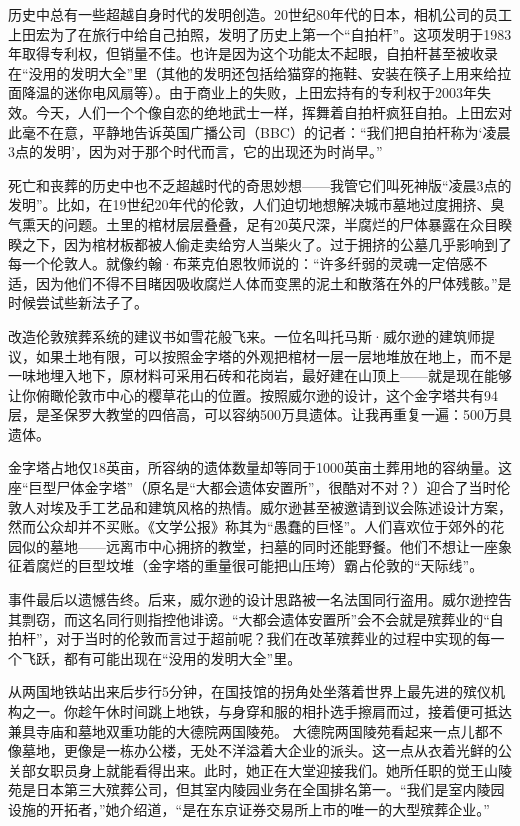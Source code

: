 \documentclass[12pt,oneside]{book}
\begin{document}
\begin{bookref}[frametitle={\cite{好好告别：世界葬礼观察手记}}]
历史中总有一些超越自身时代的发明创造。20世纪80年代的日本，相机公司的员工上田宏为了在旅行中给自己拍照，发明了历史上第一个“自拍杆”。这项发明于1983年取得专利权，但销量不佳。也许是因为这个功能太不起眼，自拍杆甚至被收录在“没用的发明大全”里（其他的发明还包括给猫穿的拖鞋、安装在筷子上用来给拉面降温的迷你电风扇等）。由于商业上的失败，上田宏持有的专利权于2003年失效。今天，人们一个个像自恋的绝地武士一样，挥舞着自拍杆疯狂自拍。上田宏对此毫不在意，平静地告诉英国广播公司（BBC）的记者：“我们把自拍杆称为‘凌晨3点的发明’，因为对于那个时代而言，它的出现还为时尚早。”

死亡和丧葬的历史中也不乏超越时代的奇思妙想——我管它们叫死神版“凌晨3点的发明”。比如，在19世纪20年代的伦敦，人们迫切地想解决城市墓地过度拥挤、臭气熏天的问题。土里的棺材层层叠叠，足有20英尺深，半腐烂的尸体暴露在众目睽睽之下，因为棺材板都被人偷走卖给穷人当柴火了。过于拥挤的公墓几乎影响到了每一个伦敦人。就像约翰·布莱克伯恩牧师说的：“许多纤弱的灵魂一定倍感不适，因为他们不得不目睹因吸收腐烂人体而变黑的泥土和散落在外的尸体残骸。”是时候尝试些新法子了。

改造伦敦殡葬系统的建议书如雪花般飞来。一位名叫托马斯·威尔逊的建筑师提议，如果土地有限，可以按照金字塔的外观把棺材一层一层地堆放在地上，而不是一味地埋入地下，原材料可采用石砖和花岗岩，最好建在山顶上——就是现在能够让你俯瞰伦敦市中心的樱草花山的位置。按照威尔逊的设计，这个金字塔共有94层，是圣保罗大教堂的四倍高，可以容纳500万具遗体。让我再重复一遍：500万具遗体。

金字塔占地仅18英亩，所容纳的遗体数量却等同于1000英亩土葬用地的容纳量。这座“巨型尸体金字塔”（原名是“大都会遗体安置所”，很酷对不对？）迎合了当时伦敦人对埃及手工艺品和建筑风格的热情。威尔逊甚至被邀请到议会陈述设计方案，然而公众却并不买账。《文学公报》称其为“愚蠢的巨怪”。人们喜欢位于郊外的花园似的墓地——远离市中心拥挤的教堂，扫墓的同时还能野餐。他们不想让一座象征着腐烂的巨型坟堆（金字塔的重量很可能把山压垮）霸占伦敦的“天际线”。

事件最后以遗憾告终。后来，威尔逊的设计思路被一名法国同行盗用。威尔逊控告其剽窃，而这名同行则指控他诽谤。“大都会遗体安置所”会不会就是殡葬业的“自拍杆”，对于当时的伦敦而言过于超前呢？我们在改革殡葬业的过程中实现的每一个飞跃，都有可能出现在“没用的发明大全”里。

从两国地铁站出来后步行5分钟，在国技馆的拐角处坐落着世界上最先进的殡仪机构之一。你趁午休时间跳上地铁，与身穿和服的相扑选手擦肩而过，接着便可抵达兼具寺庙和墓地双重功能的大德院两国陵苑。
大德院两国陵苑看起来一点儿都不像墓地，更像是一栋办公楼，无处不洋溢着大企业的派头。这一点从衣着光鲜的公关部女职员身上就能看得出来。此时，她正在大堂迎接我们。她所任职的觉王山陵苑是日本第三大殡葬公司，但其室内陵园业务在全国排名第一。“我们是室内陵园设施的开拓者，”她介绍道，“是在东京证券交易所上市的唯一的大型殡葬企业。”


\end{bookref}
\end{document}
